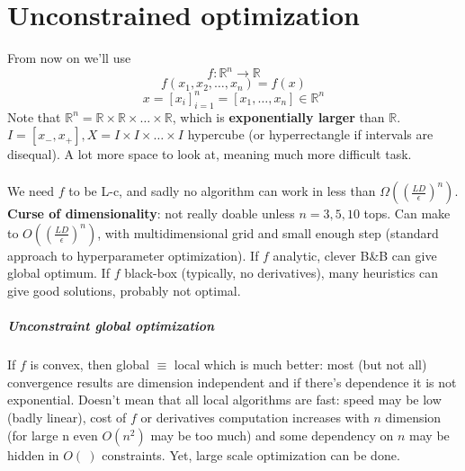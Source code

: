 \documentclass[10pt]{report}
\begin{document}
\section{Unconstrained optimization}
From now on we'll use $$f:\mathbb{R}^n\rightarrow \mathbb{R}$$ $$f(x_1,x_2,\ldots,x_n) = f(x)$$ $$x = [x_i]_{i=1}^n = [x_1,\ldots,x_n]\in \mathbb{R}^n$$
Note that $\mathbb{R}^n = \mathbb{R}\times \mathbb{R} \times\ldots\times \mathbb{R}$, which is \textbf{exponentially larger} than $\mathbb{R}$.\\
$I = [x_-, x_+], X = I\times I \times\ldots\times I$ hypercube (or hyperrectangle if intervals are disequal). A lot more space to look at, meaning much more difficult task.\\\\
We need $f$ to be L-c, and sadly no algorithm can work in less than $\Omega\left(\left(\frac{LD}{\epsilon}\right)^n\right)$.\\\textbf{Curse of dimensionality}: not really doable unless $n = 3, 5, 10$ tops. Can make to $O\left(\left(\frac{LD}{\epsilon}\right)^n\right)$, with multidimensional grid and small enough step (standard approach to hyperparameter optimization). If $f$ analytic, clever B\&B can give global optimum. If $f$ black-box (typically, no derivatives), many heuristics can give good solutions, probably not optimal.
\subparagraph{Unconstraint global optimization} If $f$ is convex, then global $\equiv$ local which is much better: most (but not all) convergence results are dimension independent and if there's dependence it is not exponential. Doesn't mean that all local algorithms are fast: speed may be low (badly linear), cost of $f$ or derivatives computation increases with $n$ dimension (for large n even $O(n^2)$ may be too much) and some dependency on $n$ may be hidden in $O(\:)$ constraints. Yet, large scale optimization can be done.
\end{document}
